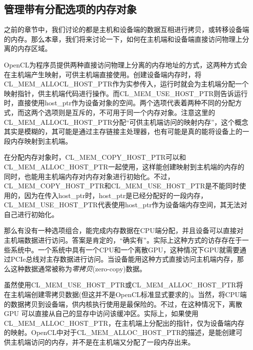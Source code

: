\subsection{管理带有分配选项的内存对象}

之前的章节中，我们讨论的都是主机和设备端的数据互相进行拷贝，或转移设备端的内存。那么本章，我们将来讨论一下，如何在主机端和设备端直接访问物理上分离的内存区域。

OpenCL为程序员提供两种直接访问物理上分离的内存地址的方式，这两种方式会在主机端产生映射，可供主机端直接使用。创建设备端内存时，将CL\_\allowbreak{}MEM\_\allowbreak{}ALLOCL\_\allowbreak{}HOST\_\allowbreak{}PTR作为实参传入，运行时就会为主机端分配一个映射指针，供主机端代码进行操作。而CL\_\allowbreak{}MEM\_\allowbreak{}USE\_\allowbreak{}HOST\_\allowbreak{}PTR则告诉运行时，直接使用host\_\allowbreak{}ptr作为设备对象的空间。两个选项代表着两种不同的分配方式，而这两个选项则是互斥的，不可用于同一个内存对象。注意这里的CL\_\allowbreak{}MEM\_\allowbreak{}ALLOCL\_\allowbreak{}HOST\_\allowbreak{}PTR分配“可供主机端访问的映射内存”，这个概念其实是模糊的，其可能是通过主存链接主处理器，也有可能是真的能将设备上的一段内存映射到主机端。

在分配内存对象时，CL\_\allowbreak{}MEM\_\allowbreak{}COPY\_\allowbreak{}HOST\_\allowbreak{}PTR可以和CL\_\allowbreak{}MEM\_\allowbreak{}ALLOC\_\allowbreak{}HOST\_\allowbreak{}PTR一起使用，这样能创建映射到主机端的内存的同时，也能用主机端内存对内存对象进行初始化。不过，CL\_\allowbreak{}MEM\_\allowbreak{}COPY\_\allowbreak{}HOST\_\allowbreak{}PTR和CL\_\allowbreak{}MEM\_\allowbreak{}USE\_\allowbreak{}HOST\_\allowbreak{}PTR是不能同时使用的，因为在传入host\_\allowbreak{}ptr时，host\_\allowbreak{}ptr是已经分配好的一段内存，CL\_\allowbreak{}MEM\_\allowbreak{}USE\_\allowbreak{}HOST\_\allowbreak{}PTR代表使用host\_\allowbreak{}ptr作为设备端内存空间，其无法对自己进行初始化。

那么有没有一种选项组合，能完成内存数据在CPU端分配，并且设备可以直接对主机端数据进行访问。答案是肯定的，“确实有”。实际上这种方式的访存存在于一些系统中。一个系统中具有一个CPU和一个离散GPU，这种情况下GPU就需要通过PCIe总线对主存数据进行访问。当设备能用这种方式直接访问主机端内存，那么这种数据通常被称为\emph{零拷贝}(zero-copy)数据。

虽然使用CL\_\allowbreak{}MEM\_\allowbreak{}USE\_\allowbreak{}HOST\_\allowbreak{}PTR或CL\_\allowbreak{}MEM\_\allowbreak{}ALLOC\_\allowbreak{}HOST\_\allowbreak{}PTR将在主机端创建零拷贝数据(但这并不是OpenCL标准显式要求的)。当然，将CPU端的数据拷贝到设备端，供内核执行使用是最保险的。不过，在这种情况下，离散 GPU 可以直接从自己的显存中访问该缓冲区。实际上，如果使用CL\_\allowbreak{}MEM\_\allowbreak{}ALLOC\_\allowbreak{}HOST\_\allowbreak{}PTR，在主机端上分配出的指针，仅为设备端内存的映射。OpenCL中对于CL\_\allowbreak{}MEM\_\allowbreak{}ALLOC\_\allowbreak{}HOST\_\allowbreak{}PTR的描述，是能创建可供主机端访问的内存，并不是在主机端又分配了一段内存出来。

